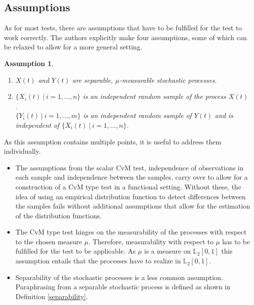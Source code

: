 \documentclass[12pt, a4paper]{article}
\theoremstyle{MAstyle} \newtheorem{assumption}{Assumption}[section]
\theoremstyle{MAstyle} \newtheorem{definition}{Definition}[section]
\theoremstyle{MAstyle} \newtheorem{theorem}{Theorem}[section]
\begin{document}
		\subsection{Assumptions}
		As for most tests, there are assumptions that have to be fulfilled for the test to work correctly. The authors explicitly make four assumptions, some of which can be relaxed to allow for a more general setting.
			\begin{assumption}\label{Ass1}\hfill\vspace{-0.8cm}
				\begin{enumerate}
					\item $X(t)$ and $Y(t)$ are separable, $\mu$-measurable stochastic processes.
					\item $\{X_i(t) \: \vert \: i = 1, \dots, n\}$ is an independent random sample of the process $X(t)$. \\
					$\{Y_i(t) \: \vert \: i = 1, \dots, m\}$ is an independent random sample of $Y(t)$ and is independent of $\{X_i(t) \: \vert \: i = 1, \dots, n\}$.
				\end{enumerate}
			\end{assumption}
		As this assumption contains multiple points, it is useful to address them individually.
			\begin{itemize}
				\item The assumptions from the scalar CvM test, independence of observations in each sample and independence between the samples, carry over to allow for a construction of a CvM type test in a functional setting. Without these, the idea of using an empirical distribution function to detect differences between the samples fails without additional assumptions that allow for the estimation of the distribution functions.
				\item The CvM type test hinges on the measurability of the processes with respect to the chosen measure $\mu$. Therefore, measurability with respect to $\mu$ has to be fulfilled for the test to be applicable. As $\mu$ is a measure on $\mathbb{L}_2[0,1]$ this assumption entails that the processes have to realize in $\mathbb{L}_2[0,1]$.
				\item Separability of the stochastic processes is a less common assumption. Paraphrasing from \cite{gihman_theory_2004} a separable stochastic process is defined as shown in Definition \ref{separability}.
			\end{itemize}
\end{document}
